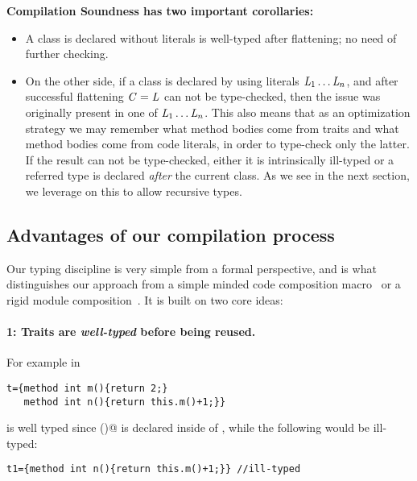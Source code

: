 \noindent 
\textbf{Compilation Soundness has two important corollaries:}
\begin{itemize}
\item A class is declared without literals
is well-typed after flattening; no need of further checking.
\item On the other side, if a class is declared by using literals $\mathit{L}_1\ldots\mathit{L}_n$, and after successful flattening $\mathit{C} = \mathit{L}$ can not be type-checked,
then the issue was originally present in one of $\mathit{L}_1\ldots\mathit{L}_n$.
This also means that as an optimization strategy
 we may remember what method bodies come from traits and what method bodies come from code literals, in order to type-check only the latter.
If the result can not be type-checked, either it is intrinsically ill-typed or a 
referred type is declared \emph{after} the current class. 
As we see in the next section, we leverage on this 
to allow recursive types.
 \end{itemize}





\saveSpace
\subsection{Advantages of our compilation process}
\saveSpace

Our typing discipline is very simple from a formal perspective,  
and is what distinguishes our approach from a simple minded code composition macro~\cite{bawden1999quasiquotation}
or a rigid module composition~\cite{ancona2002calculus}. 
It is built on two core ideas:

\paragraph{1: Traits are \emph{well-typed} before being reused.}
 For example in

\saveSpace\saveSpace\begin{lstlisting}
t={method int m(){return 2;} 
   method int n(){return this.m()+1;}}
\end{lstlisting}\saveSpace\saveSpace

\noindent \Q@t@ is well typed since \Q@m()@ is declared inside of \Q@t@, while the following would be ill-typed:

\saveSpace\saveSpace\begin{lstlisting}
t1={method int n(){return this.m()+1;}} //ill-typed
\end{lstlisting}\saveSpace\saveSpace


